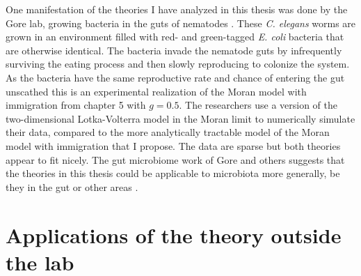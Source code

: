One manifestation of the theories I have analyzed in this thesis was done by the Gore lab, growing bacteria in the guts of nematodes \cite{Vega2017}. 
These \emph{C. elegans} worms are grown in an environment filled with red- and green-tagged \emph{E. coli} bacteria that are otherwise identical. 
The bacteria invade the nematode guts by infrequently surviving the eating process and then slowly reproducing to colonize the system. %
As the bacteria have the same reproductive rate and chance of entering the gut unscathed this is an experimental realization of the Moran model with immigration from chapter 5 with $g=0.5$. 
The researchers use a version of the two-dimensional Lotka-Volterra model in the Moran limit to numerically simulate their data, compared to the more analytically tractable model of the Moran model with immigration that I propose. 
The data are sparse but both theories appear to fit nicely. 
The gut microbiome work of Gore and others \cite{Vega2017,Roeselers2011} suggests that the theories in this thesis could be applicable to microbiota more generally, be they in the gut or other areas \cite{Manichanh2010,Koenig2011,Theriot2014,Wolfe2014,Fisher2015,Coburn2015,Datta2016}. %


\iffalse
\section{Applications of the theory outside the lab}%

